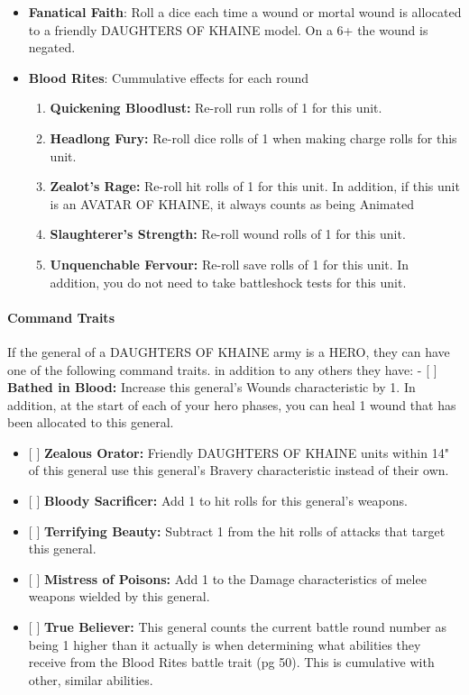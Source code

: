 \begin{itemize}
\item
  \textbf{Fanatical Faith}: Roll a dice each time a wound or mortal
  wound is allocated to a friendly DAUGHTERS OF KHAINE model. On a 6+
  the wound is negated.
\item
  \textbf{Blood Rites}: Cummulative effects for each round

  \begin{enumerate}
  \def\labelenumi{\arabic{enumi}.}
  \tightlist
  \item
    \textbf{Quickening Bloodlust:} Re-roll run rolls of 1 for this unit.
  \item
    \textbf{Headlong Fury:} Re-roll dice rolls of 1 when making charge
    rolls for this unit.
  \item
    \textbf{Zealot's Rage:} Re-roll hit rolls of 1 for this unit. In
    addition, if this unit is an AVATAR OF KHAINE, it always counts as
    being Animated
  \item
    \textbf{Slaughterer's Strength:} Re-roll wound rolls of 1 for this
    unit.
  \item
    \textbf{Unquenchable Fervour:} Re-roll save rolls of 1 for this
    unit. In addition, you do not need to take battleshock tests for
    this unit.
  \end{enumerate}
\end{itemize}

\hypertarget{command-traits}{%
\paragraph{Command Traits}\label{command-traits}}

If the general of a DAUGHTERS OF KHAINE army is a HERO, they can have
one of the following command traits. in addition to any others they
have: - {[} {]} \textbf{Bathed in Blood:} Increase this general's Wounds
characteristic by 1. In addition, at the start of each of your hero
phases, you can heal 1 wound that has been allocated to this general.

\begin{itemize}
\item
  {[} {]} \textbf{Zealous Orator:} Friendly DAUGHTERS OF KHAINE units
  within 14" of this general use this general's Bravery characteristic
  instead of their own.
\item
  {[} {]} \textbf{Bloody Sacrificer:} Add 1 to hit rolls for this
  general's weapons.
\item
  {[} {]} \textbf{Terrifying Beauty:} Subtract 1 from the hit rolls of
  attacks that target this general.
\item
  {[} {]} \textbf{Mistress of Poisons:} Add 1 to the Damage
  characteristics of melee weapons wielded by this general.
\item
  {[} {]} \textbf{True Believer:} This general counts the current battle
  round number as being 1 higher than it actually is when determining
  what abilities they receive from the Blood Rites battle trait (pg 50).
  This is cumulative with other, similar abilities.
\end{itemize}

